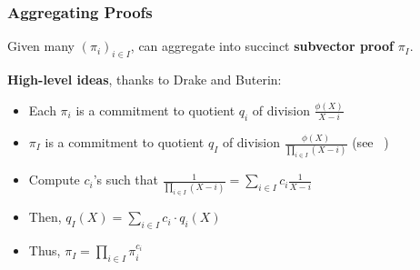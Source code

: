 \begin{frame}
    \frametitle{Aggregating Proofs}
    \pause
    Given many $(\pi_i)_{i \in I}$, can aggregate into succinct \textbf{subvector proof} $\pi_I$.\pause

    \textbf{High-level ideas}, thanks to Drake and Buterin:\pause
    \begin{itemize}
        \item Each $\pi_i$ is a commitment to quotient $q_i$ of division $\frac{\phi(X)}{X-i}$\pause
        \item $\pi_I$ is a commitment to quotient $q_I$ of division $\frac{\phi(X)}{\prod_{i\in I} (X-i)}$ (see ~\cite{KZG10a})\pause
        \item Compute $c_i$'s such that $\frac{1}{\prod_{i\in I}(X-i)} = \sum_{i\in I} c_i \frac{1}{X-i}$\pause
        \item Then, $q_I(X) = \sum_{i\in I} c_i \cdot q_i(X)$\pause
        \item Thus, $\pi_I = \prod_{i\in I} \pi_i^{c_i}$
    \end{itemize}
\end{frame}